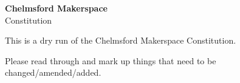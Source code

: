 
\begin{titlepage}
\begin{center}
{\bf \LARGE Chelmsford Makerspace}\\[36pt]
{\Large Constitution}

This is a dry run of the Chelmsford Makerspace Constitution.

Please read through and mark up things that need to be changed/amended/added.

\vfill

\end{center}
\end{titlepage}


